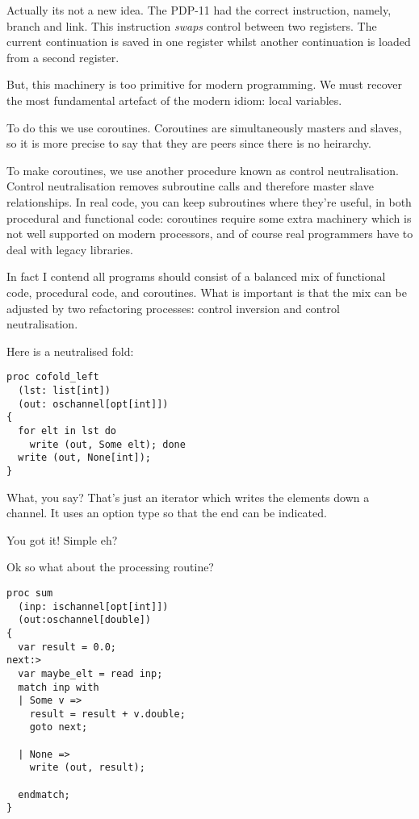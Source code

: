 \documentclass{article}
\begin{document}
Actually its not a new idea. The PDP-11 had the correct instruction,
namely, branch and link. This instruction {\em swaps} control between
two registers. The current continuation is saved in one register whilst
another continuation is loaded from a second register.

But, this machinery is too primitive for modern programming.
We must recover the most fundamental artefact of the modern
idiom: local variables. 

To do this we use coroutines. Coroutines are simultaneously masters and slaves,
so it is more precise to say that they are peers since there is no heirarchy.

To make coroutines, we use another procedure known as control neutralisation.
Control neutralisation removes subroutine calls and therefore master
slave relationships. In real code, you can keep subroutines where they're
useful, in both procedural and functional code: coroutines require some
extra machinery which is not well supported on modern processors, and of course
real programmers have to deal with legacy libraries.

In fact I contend all programs should consist of a balanced mix of 
functional code, procedural code, and coroutines. What is important
is that the mix can be adjusted by two refactoring processes:
control inversion and control neutralisation.

Here is a neutralised fold:

\begin{verbatim}
proc cofold_left 
  (lst: list[int])
  (out: oschannel[opt[int]])
{
  for elt in lst do 
    write (out, Some elt); done
  write (out, None[int]);
}
\end{verbatim}

What, you say? That's just an iterator which writes
the elements down a channel. It uses an option type
so that the end can be indicated.

You got it! Simple eh?

Ok so what about the processing routine?

\begin{verbatim}
proc sum 
  (inp: ischannel[opt[int]])
  (out:oschannel[double]) 
{
  var result = 0.0;
next:>
  var maybe_elt = read inp;
  match inp with
  | Some v =>
    result = result + v.double;
    goto next;

  | None => 
    write (out, result);

  endmatch;
}
\end{verbatim}
\end{document}
